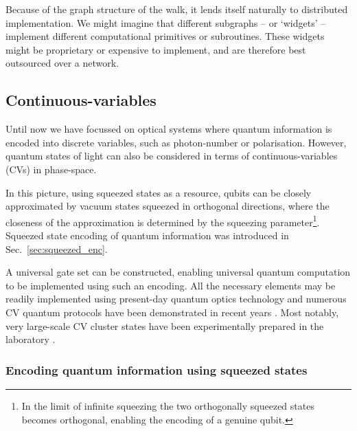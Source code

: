 Because of the graph structure of the walk, it lends itself naturally to distributed implementation. We might imagine that different subgraphs -- or `widgets' \cite{bib:Lovett10, bib:Childs09} -- implement different computational primitives or subroutines. These widgets might be proprietary or expensive to implement, and are therefore best outsourced over a network.

%
%

\subsection{Continuous-variables} \label{sec:CV_QC} 

Until now we have focussed on optical systems where quantum information is encoded into discrete variables, such as photon-number or polarisation. However, quantum states of light can also be considered in terms of continuous-variables (CVs) in phase-space.

In this picture, using squeezed states as a resource, qubits can be closely approximated by vacuum states squeezed in orthogonal directions, where the closeness of the approximation is determined by the squeezing parameter\footnote{In the limit of infinite squeezing the two orthogonally squeezed states becomes orthogonal, enabling the encoding of a genuine qubit.}. Squeezed state encoding of quantum information was introduced in Sec.~\ref{sec:squeezed_enc}.

A universal gate set can be constructed, enabling universal quantum computation to be implemented using such an encoding. All the necessary elements may be readily implemented using present-day quantum optics technology and numerous CV quantum protocols have been demonstrated in recent years \cite{bib:RevModPhys.77.513}. Most notably, very large-scale CV cluster states have been experimentally prepared in the laboratory \cite{nickmenicucci???}.

%
%

\subsubsection{Encoding quantum information using squeezed states}


